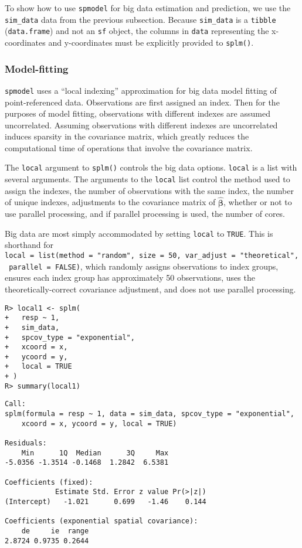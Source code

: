 \documentclass[10pt,letterpaper]{article}
\begin{document}
To show how to use \texttt{spmodel} for big data estimation and
prediction, we use the \texttt{sim\_data} data from the previous
subsection. Because \texttt{sim\_data} is a \texttt{tibble}
(\texttt{data.frame}) and not an \texttt{sf} object, the columns in
\texttt{data} representing the x-coordinates and y-coordinates must be
explicitly provided to \texttt{splm()}.

\hypertarget{model-fitting}{%
\subsubsection{Model-fitting}\label{model-fitting}}

\texttt{spmodel} uses a ``local indexing'' approximation for big data
model fitting of point-referenced data. Observations are first assigned
an index. Then for the purposes of model fitting, observations with
different indexes are assumed uncorrelated. Assuming observations with
different indexes are uncorrelated induces sparsity in the covariance
matrix, which greatly reduces the computational time of operations that
involve the covariance matrix.

The \texttt{local} argument to \texttt{splm()} controls the big data
options. \texttt{local} is a list with several arguments. The arguments
to the \texttt{local} list control the method used to assign the
indexes, the number of observations with the same index, the number of
unique indexes, adjustments to the covariance matrix of
\(\hat{\boldsymbol{\beta}}\), whether or not to use parallel processing,
and if parallel processing is used, the number of cores.

Big data are most simply accommodated by setting \texttt{local} to
\texttt{TRUE}. This is shorthand for
\texttt{local\ =\ list(method\ =\ "random",\ size\ =\ 50,\ var\_adjust\ =\ "theoretical",\ parallel\ =\ FALSE)},
which randomly assigns observations to index groups, ensures each index
group has approximately 50 observations, uses the theoretically-correct
covariance adjustment, and does not use parallel processing.

\begin{verbatim}
R> local1 <- splm(
+   resp ~ 1,
+   sim_data,
+   spcov_type = "exponential",
+   xcoord = x,
+   ycoord = y,
+   local = TRUE
+ )
R> summary(local1)
\end{verbatim}

\begin{verbatim}
Call:
splm(formula = resp ~ 1, data = sim_data, spcov_type = "exponential", 
    xcoord = x, ycoord = y, local = TRUE)

Residuals:
    Min      1Q  Median      3Q     Max 
-5.0356 -1.3514 -0.1468  1.2842  6.5381 

Coefficients (fixed):
            Estimate Std. Error z value Pr(>|z|)
(Intercept)   -1.021      0.699   -1.46    0.144

Coefficients (exponential spatial covariance):
    de     ie  range 
2.8724 0.9735 0.2644 
\end{verbatim}
\end{document}
